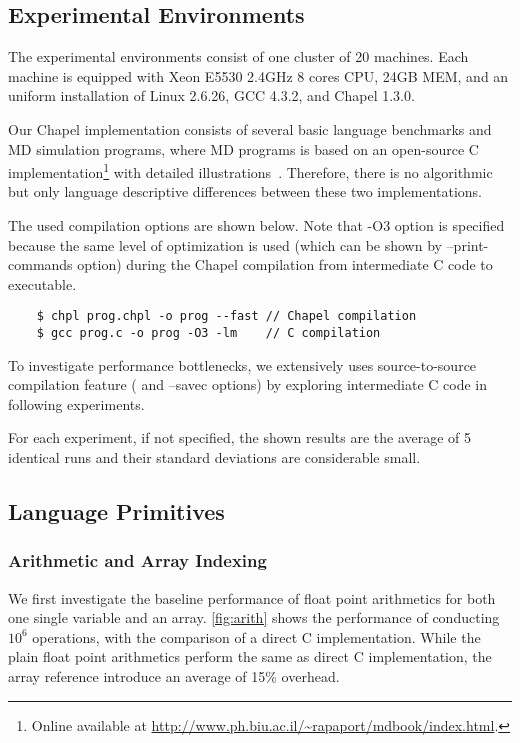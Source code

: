 \subsection{Experimental Environments}
The experimental environments consist of one cluster of 20 machines. Each
machine is equipped with Xeon E5530 2.4GHz 8 cores CPU, 24GB MEM, and an
uniform installation of Linux 2.6.26, GCC 4.3.2, and Chapel 1.3.0.

Our Chapel implementation consists of several basic language benchmarks and
\ac{MD} simulation programs, where \ac{MD} programs is based on an open-source
C implementation\footnote{ Online available at
\url{http://www.ph.biu.ac.il/~rapaport/mdbook/index.html}.} with detailed
illustrations~\cite{rapaport04md}. Therefore, there is no algorithmic but only
language descriptive differences between these two implementations.

The used compilation options are shown below. Note that {\ic -O3} option is
specified because the same level of optimization is used (which can be shown by
{\ic --print-commands} option) during the Chapel compilation from intermediate
C code to executable.
\begin{lstlisting}
    $ chpl prog.chpl -o prog --fast // Chapel compilation
    $ gcc prog.c -o prog -O3 -lm    // C compilation
\end{lstlisting}
To investigate performance bottlenecks, we extensively uses source-to-source
compilation feature ( and {\ic --savec} options) by exploring
intermediate C code in following experiments.

For each experiment, if not specified, the shown results are the average of 5
identical runs and their standard deviations are considerable small.

\subsection{Language Primitives}
\subsubsection{Arithmetic and Array Indexing}
We first investigate the baseline performance of float point arithmetics for
both one single variable and an array. \autoref{fig:arith} shows the
performance of conducting $10^6$ operations, with the comparison of a direct C
implementation. While the plain float point arithmetics perform the same as
direct C implementation, the array reference introduce an average of 15\%
overhead.

